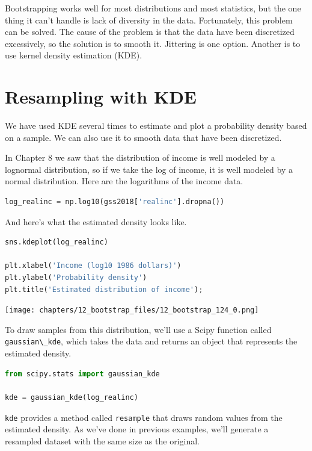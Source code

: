Bootstrapping works well for most distributions and most statistics, but
the one thing it can't handle is lack of diversity in the data.
Fortunately, this problem can be solved. The cause of the problem is
that the data have been discretized excessively, so the solution is to
smooth it. Jittering is one option. Another is to use kernel density
estimation (KDE).

\section{Resampling with KDE}\label{resampling-with-kde}

We have used KDE several times to estimate and plot a probability
density based on a sample. We can also use it to smooth data that have
been discretized.

In Chapter 8 we saw that the distribution of income is well modeled by a
lognormal distribution, so if we take the log of income, it is well
modeled by a normal distribution. Here are the logarithms of the income
data.

\begin{lstlisting}[language=Python,style=source]
log_realinc = np.log10(gss2018['realinc'].dropna())
\end{lstlisting}

And here's what the estimated density looks like.

\begin{lstlisting}[language=Python,style=source]
sns.kdeplot(log_realinc)

plt.xlabel('Income (log10 1986 dollars)')
plt.ylabel('Probability density')
plt.title('Estimated distribution of income');
\end{lstlisting}

\begin{center}
\texttt{[image: chapters/12\_bootstrap\_files/12\_bootstrap\_124\_0.png]}
\end{center}

To draw samples from this distribution, we'll use a Scipy function
called \passthrough{\lstinline!gaussian\_kde!}, which takes the data and
returns an object that represents the estimated density.

\begin{lstlisting}[language=Python,style=source]
from scipy.stats import gaussian_kde

kde = gaussian_kde(log_realinc)
\end{lstlisting}

\passthrough{\lstinline!kde!} provides a method called
\passthrough{\lstinline!resample!} that draws random values from the
estimated density. As we've done in previous examples, we'll generate a
resampled dataset with the same size as the original.

